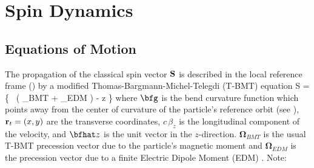 \chapter{Spin Dynamics}
\label{c:spin}

\section{Equations of Motion}
\label{s:spin.dyn}

The propagation of the classical spin vector ${\bf S}$ is described in the local reference
frame () by a modified Thomas-Bargmann-Michel-Telegdi
(T-BMT) equation\cite{b:spin.hoff}
\Begineq
   \Bf S = 
  \left\{  \, 
  \left( {\pmb\Omega}_{BMT} + {\pmb\Omega}_{EDM} \right) - 
  \bfg \times \bfhat z \right\} \times {}
  \label{tbmt}
\Endeq
where $\bfg$ is the bend curvature function which points away from the center of curvature
of the particle's reference orbit (see ), ${\bf r}_t = (x, y)$ are the
transverse coordinates, $c \, \beta_z$ is the longitudinal component of the velocity, and
$\bfhat z$ is the unit vector in the $z$-direction. $\pmb\Omega_{BMT}$ is the usual T-BMT
precession vector due to the particle's magnetic moment and $\pmb\Omega_{EDM}$ is the
precession vector due to a finite Electric Dipole Moment (EDM) \cite{b:silenko}. Note:
